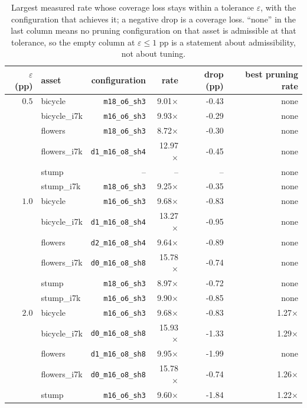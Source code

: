 \begin{table}[t]
\centering
\small
\footnotesize
\setlength{\tabcolsep}{2.8pt}
\caption{Largest measured rate whose coverage loss stays within a tolerance $\varepsilon$, with the configuration that achieves it; a negative drop is a coverage loss. ``none'' in the last column means no pruning configuration on that asset is admissible at that tolerance, so the empty column at $\varepsilon \le 1$ pp is a statement about admissibility, not about tuning.}
\label{tab:frontier}
\begin{tabular}{rlrrrr}
\toprule
$\varepsilon$ (pp) & asset & configuration & rate & drop (pp) & best pruning rate \\
\midrule
$0.5$ & bicycle & \texttt{m18\_o6\_sh3} & 9.01$\times$ & -0.43 & none \\
 & bicycle\_i7k & \texttt{m16\_o6\_sh3} & 9.93$\times$ & -0.29 & none \\
 & flowers & \texttt{m18\_o6\_sh3} & 8.72$\times$ & -0.30 & none \\
 & flowers\_i7k & \texttt{d1\_m16\_o8\_sh4} & 12.97$\times$ & -0.45 & none \\
 & stump & -- & -- & -- & none \\
 & stump\_i7k & \texttt{m18\_o6\_sh3} & 9.25$\times$ & -0.35 & none \\
\midrule
$1.0$ & bicycle & \texttt{m16\_o6\_sh3} & 9.68$\times$ & -0.83 & none \\
 & bicycle\_i7k & \texttt{d1\_m16\_o8\_sh4} & 13.27$\times$ & -0.95 & none \\
 & flowers & \texttt{d2\_m16\_o8\_sh4} & 9.64$\times$ & -0.89 & none \\
 & flowers\_i7k & \texttt{d0\_m16\_o8\_sh8} & 15.78$\times$ & -0.74 & none \\
 & stump & \texttt{m18\_o6\_sh3} & 8.97$\times$ & -0.72 & none \\
 & stump\_i7k & \texttt{m16\_o6\_sh3} & 9.90$\times$ & -0.85 & none \\
\midrule
$2.0$ & bicycle & \texttt{m16\_o6\_sh3} & 9.68$\times$ & -0.83 & 1.27$\times$ \\
 & bicycle\_i7k & \texttt{d0\_m16\_o8\_sh8} & 15.93$\times$ & -1.33 & 1.29$\times$ \\
 & flowers & \texttt{d1\_m16\_o8\_sh8} & 9.95$\times$ & -1.99 & none \\
 & flowers\_i7k & \texttt{d0\_m16\_o8\_sh8} & 15.78$\times$ & -0.74 & 1.26$\times$ \\
 & stump & \texttt{m16\_o6\_sh3} & 9.60$\times$ & -1.84 & 1.22$\times$ \\

\end{tabular}
\end{table}
